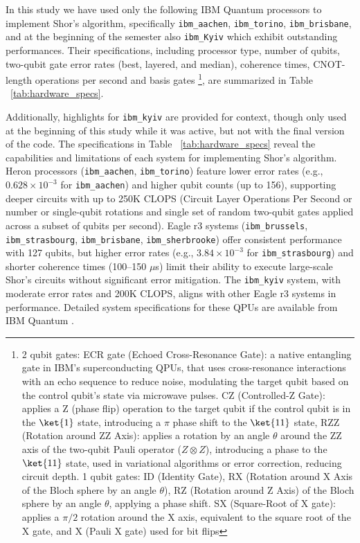 \documentclass[conference,twoside]{IEEEtran}
\begin{document}
In this study we have used only the following IBM Quantum processors to implement Shor's algorithm, specifically \texttt{ibm\_aachen}, \texttt{ibm\_torino}, \texttt{ibm\_brisbane}, and at the beginning of the semester also \texttt{ibm\_Kyiv} which exhibit outstanding performances. Their specifications, including processor type, number of qubits, two-qubit gate error rates (best, layered, and median), coherence times, CNOT-length operations per second and basis gates \footnote{2 qubit gates: ECR gate (Echoed Cross-Resonance Gate): a native entangling gate in IBM's superconducting QPUs, that uses cross-resonance interactions with an echo sequence to reduce noise, modulating the target qubit based on the control qubit's state via microwave pulses. CZ (Controlled-Z Gate): applies a Z (phase flip) operation to the target qubit if the control qubit is in the $\ket{1}$ state, introducing a $\pi$ phase shift to the $\ket{11}$ state, RZZ (Rotation around ZZ Axis): applies a rotation by an angle $\theta$ around the ZZ axis of the two-qubit Pauli operator ($Z \otimes Z$), introducing a phase to the $\ket{11}$ state, used in variational algorithms or error correction, reducing circuit depth. 1 qubit gates: ID (Identity Gate), RX (Rotation around X Axis of the Bloch sphere by an angle $\theta$), RZ (Rotation around Z Axis) of the Bloch sphere by an angle $\theta$, applying a phase shift. SX (Square-Root of X gate): applies a $\pi/2$ rotation around the X axis, equivalent to the square root of the X gate, and X (Pauli X gate) used for bit flips}, are summarized in Table ~\ref{tab:hardware_specs}. 

Additionally, highlights for \texttt{ibm\_kyiv} are provided for context, though only used at the beginning of this study while it was active, but not with the final version of the code. The specifications in Table ~\ref{tab:hardware_specs} reveal the capabilities and limitations of each system for implementing Shor's algorithm. Heron processors (\texttt{ibm\_aachen}, \texttt{ibm\_torino}) feature lower error rates (e.g., \( 0.628 \times 10^{-3} \) for \texttt{ibm\_aachen}) and higher qubit counts (up to 156), supporting deeper circuits with up to 250K CLOPS (Circuit Layer Operations Per Second or number or single-qubit rotations and single set of random two-qubit gates applied across a subset of qubits per second). Eagle r3 systems (\texttt{ibm\_brussels}, \texttt{ibm\_strasbourg}, \texttt{ibm\_brisbane}, \texttt{ibm\_sherbrooke}) offer consistent performance with 127 qubits, but higher error rates (e.g., \( 3.84 \times 10^{-3} \) for \texttt{ibm\_strasbourg}) and shorter coherence times (100--150 \(\mu\)s) limit their ability to execute large-scale Shor's circuits without significant error mitigation. The \texttt{ibm\_kyiv} system, with moderate error rates and 200K CLOPS, aligns with other Eagle r3 systems in performance. Detailed system specifications for these QPUs are available from IBM Quantum \citep*{ibmquantum2025}. 
\end{document}
